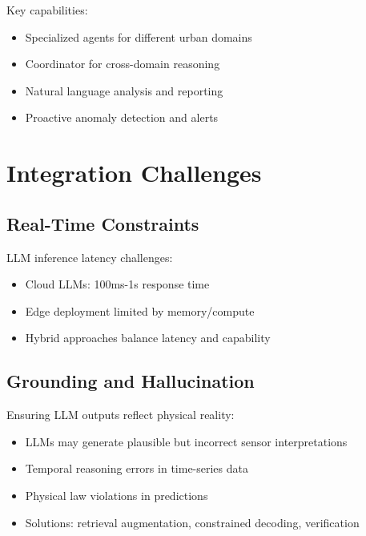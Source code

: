 \documentclass[12pt,a4paper]{article}
\begin{document}
Key capabilities:
\begin{itemize}
    \item Specialized agents for different urban domains
    \item Coordinator for cross-domain reasoning
    \item Natural language analysis and reporting
    \item Proactive anomaly detection and alerts
\end{itemize}

\section{Integration Challenges}

\subsection{Real-Time Constraints}

LLM inference latency challenges:
\begin{itemize}
    \item Cloud LLMs: 100ms-1s response time
    \item Edge deployment limited by memory/compute
    \item Hybrid approaches balance latency and capability
\end{itemize}

\subsection{Grounding and Hallucination}

Ensuring LLM outputs reflect physical reality:
\begin{tcolorbox}[colback=red!10, colframe=red!50, title=Grounding Challenges]
\begin{itemize}
    \item LLMs may generate plausible but incorrect sensor interpretations
    \item Temporal reasoning errors in time-series data
    \item Physical law violations in predictions
    \item Solutions: retrieval augmentation, constrained decoding, verification
\end{itemize}
\end{tcolorbox}
\end{document}
